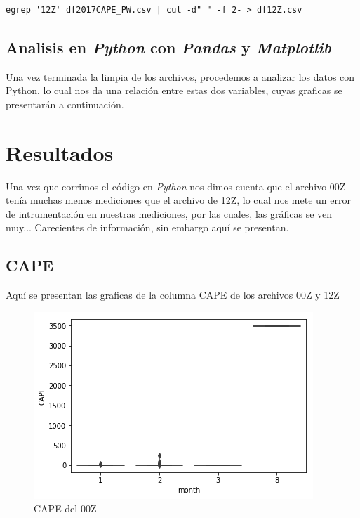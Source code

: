 \documentclass{article}
\begin{document}
\begin{verbatim}
egrep '12Z' df2017CAPE_PW.csv | cut -d" " -f 2- > df12Z.csv
\end{verbatim}

\subsection{Analisis en \textit{Python} con \textit{Pandas} y \textit{Matplotlib}}
Una vez terminada la limpia de los archivos, procedemos a analizar los datos con Python, lo cual nos da una relación entre estas dos variables, cuyas graficas se presentarán a continuación.

\section{Resultados}
Una vez que corrimos el código en \textit{Python} nos dimos cuenta que el archivo 00Z tenía muchas menos mediciones que el archivo de 12Z, lo cual nos mete un error de intrumentación en nuestras mediciones, por las cuales, las gráficas se ven muy... Carecientes de información, sin embargo aquí se presentan.

\subsection{CAPE}
Aquí se presentan las graficas de la columna CAPE de los archivos 00Z y 12Z

\begin{figure}[H]
\includegraphics[width=\linewidth]{CAPE00Z.png}
\caption {CAPE del 00Z}
\end{figure}
\end{document}
